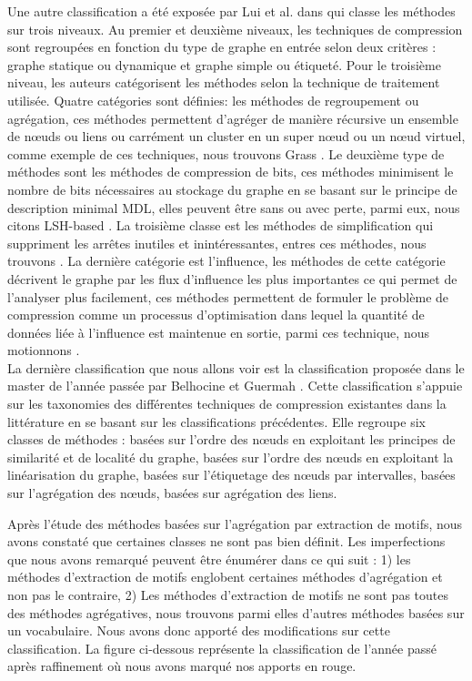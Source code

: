 Une autre classification a été exposée par Lui et al. dans \citep{liu2018graph} qui classe les méthodes sur trois niveaux. Au premier et deuxième niveaux, les techniques de compression sont regroupées en fonction du type de graphe en entrée selon deux critères : graphe statique ou dynamique et graphe simple ou étiqueté. Pour le troisième niveau, les auteurs catégorisent les méthodes selon la technique de traitement utilisée. Quatre catégories sont définies: les méthodes de regroupement ou agrégation, ces méthodes permettent d'agréger de manière récursive un ensemble de nœuds ou liens ou carrément un cluster en un super nœud ou un nœud virtuel, comme exemple de ces techniques, nous trouvons Grass \citep{lefevre2010grass}. Le deuxième type de méthodes sont les méthodes de compression de bits, ces méthodes minimisent le nombre de bits nécessaires au stockage du graphe en se basant sur le principe de description minimal MDL, elles peuvent être sans ou avec perte, parmi eux, nous citons LSH-based \citep{khan2014set}. La troisième classe est les méthodes de simplification qui suppriment les arrêtes inutiles et inintéressantes, entres ces méthodes, nous trouvons \citep{shen2006visual}. La dernière catégorie est l'influence, les méthodes de cette catégorie décrivent le graphe par les flux d'influence les plus importantes ce qui permet de l'analyser plus facilement, ces méthodes permettent de formuler le problème de compression comme un processus d'optimisation dans lequel la quantité de données liée à l'influence est maintenue en sortie, parmi ces technique, nous motionnons \citep{shi2015vegas}.\\


La dernière classification que nous allons voir est la classification proposée dans le master de l'année passée par Belhocine et Guermah \citep{master2017}. Cette classification s'appuie sur les taxonomies des différentes techniques de compression existantes dans la littérature en se basant sur les classifications précédentes. Elle regroupe six classes de méthodes :  basées sur l'ordre des nœuds en exploitant les principes de similarité et de localité du graphe, basées sur l'ordre des nœuds en exploitant la linéarisation du graphe, basées sur l'étiquetage des nœuds par intervalles, basées sur l'agrégation des nœuds, basées sur agrégation des liens. 

Après l'étude des méthodes basées sur l'agrégation par extraction de motifs, nous avons constaté que certaines classes ne sont pas bien définit. Les imperfections que nous avons remarqué peuvent être énumérer dans ce qui suit : 1) les méthodes d'extraction de motifs englobent certaines méthodes d'agrégation et non pas le contraire, 2) Les méthodes d'extraction de motifs ne sont pas toutes des méthodes agrégatives, nous trouvons parmi elles d'autres méthodes basées sur un vocabulaire. Nous avons donc apporté des modifications sur cette classification. La figure ci-dessous représente la classification de l'année passé après raffinement où nous avons marqué nos apports en rouge.

